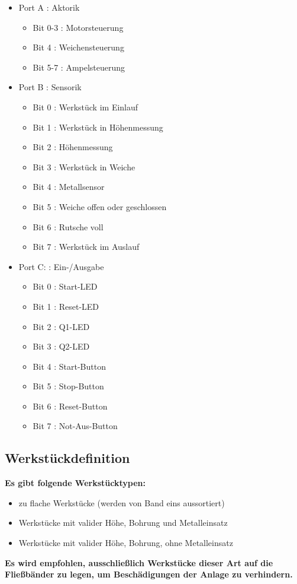 \documentclass[oneside,a4paper,titlepage]{scrartcl} %
\begin{document}
\begin{itemize}
    \item Port A : Aktorik
    \begin{itemize}
        \item Bit 0-3 : Motorsteuerung
        \item Bit 4 : Weichensteuerung
        \item Bit 5-7 : Ampelsteuerung
    \end{itemize}
    \item Port B : Sensorik
    \begin{itemize}
        \item Bit 0 : Werkstück im Einlauf
        \item Bit 1 : Werkstück in Höhenmessung
        \item Bit 2 : Höhenmessung
        \item Bit 3 : Werkstück in Weiche
        \item Bit 4 : Metallsensor
        \item Bit 5 : Weiche offen oder geschlossen
        \item Bit 6 : Rutsche voll
        \item Bit 7 : Werkstück im Auslauf
    \end{itemize}
    \item Port C: : Ein-/Ausgabe
    \begin{itemize}
        \item Bit 0 : Start-LED
        \item Bit 1 : Reset-LED
        \item Bit 2 : Q1-LED
        \item Bit 3 : Q2-LED
        \item Bit 4 : Start-Button
        \item Bit 5 : Stop-Button
        \item Bit 6 : Reset-Button
        \item Bit 7 : Not-Aus-Button \newline
    \end{itemize}
\end{itemize}


\subsection{Werkstückdefinition}
\textbf{Es gibt folgende Werkstücktypen: }
\begin{itemize}
    \item zu flache Werkstücke (werden von Band eins aussortiert)
    \item Werkstücke mit valider Höhe, Bohrung und Metalleinsatz 
    \item Werkstücke mit valider Höhe, Bohrung, ohne Metalleinsatz 
\end{itemize}
\textbf{Es wird empfohlen, ausschließlich Werkstücke dieser Art auf die Fließbänder zu legen, um Beschädigungen der Anlage zu verhindern.}
\newpage
\end{document}
